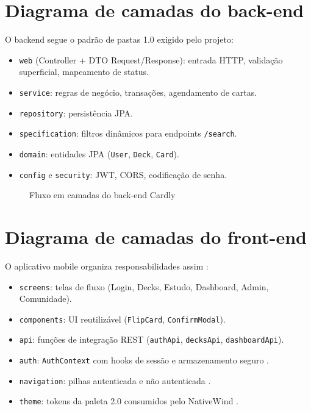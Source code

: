 \section{Diagrama de camadas do back-end}

O backend segue o padrão de pastas 1.0 exigido pelo projeto:

\begin{itemize}
    \item \texttt{web} (Controller + DTO Request/Response): entrada HTTP, validação superficial, mapeamento de status.
    \item \texttt{service}: regras de negócio, transações, agendamento de cartas.
    \item \texttt{repository}: persistência JPA.
    \item \texttt{specification}: filtros dinâmicos para endpoints \texttt{/search}.
    \item \texttt{domain}: entidades JPA (\texttt{User}, \texttt{Deck}, \texttt{Card}).
    \item \texttt{config} e \texttt{security}: JWT, CORS, codificação de senha.
\end{itemize}

\begin{figure}[htbp]
    \centering
    \caption{Fluxo em camadas do back-end Cardly}
    \label{fig:camadas-backend}
\end{figure}

\section{Diagrama de camadas do front-end}

O aplicativo mobile organiza responsabilidades assim \cite{react_hooks_docs}:

\begin{itemize}
    \item \texttt{screens}: telas de fluxo (Login, Decks, Estudo, Dashboard, Admin, Comunidade).
    \item \texttt{components}: UI reutilizável (\texttt{FlipCard}, \texttt{ConfirmModal}).
    \item \texttt{api}: funções de integração REST (\texttt{authApi}, \texttt{decksApi}, \texttt{dashboardApi}).
    \item \texttt{auth}: \texttt{AuthContext} com hooks de sessão e armazenamento seguro \cite{expo_secure_store}.
    \item \texttt{navigation}: pilhas autenticada e não autenticada \cite{react_navigation}.
    \item \texttt{theme}: tokens da paleta 2.0 consumidos pelo NativeWind \cite{nativewind_docs}.
\end{itemize}

